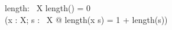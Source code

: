 \documentclass[a4paper,10pt,fleqn]{article}
\begin{document}
\begin{gendef}[X]
  length: \seq~X \fun \nat
\where
  length(\langle \rangle) = 0 \land \\
\quad (\forall x : X; s : \seq~X @ length(\langle x \rangle \cat s) = 1 + length(s))
\end{gendef}
\end{document}
